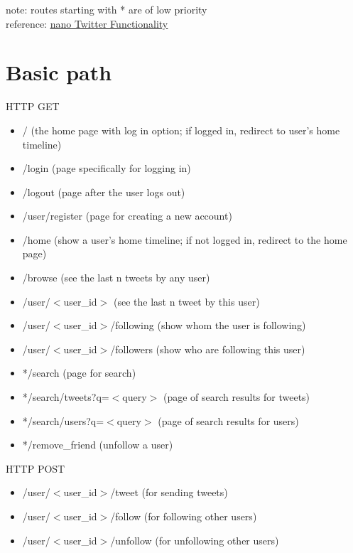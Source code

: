 \documentclass{article}
\begin{document}
	\noindent note: routes starting with * are of low priority \\
	reference: \href{http://cosi105b-f2016.s3-website-us-west-2.amazonaws.com/content/nt/01_nt_functionality.md/}{\underline{nano Twitter Functionality}}
	\section{Basic path}
	HTTP GET
	\begin{itemize}
		\item / (the home page with log in option; if logged in, redirect to user's home timeline)
		\item /login (page specifically for logging in)
		\item /logout (page after the user logs out)
		\item /user/register (page for creating a new account)
		\item /home (show a user's home timeline; if not logged in, redirect to the home page)
		\item /browse (see the last n tweets by any user)
		\item /user/$<$user\_id$>$ (see the last n tweet by this user)
		\item /user/$<$user\_id$>$/following (show whom the user is following)
		\item /user/$<$user\_id$>$/followers (show who are following this user)
		\item */search (page for search)
		\item */search/tweets?q=$<$query$>$ (page of search results for tweets)
		\item */search/users?q=$<$query$>$ (page of search results for users)
		\item */remove\_friend (unfollow a user)
	\end{itemize}
	HTTP POST
	\begin{itemize}
		\item /user/$<$user\_id$>$/tweet (for sending tweets)
		\item /user/$<$user\_id$>$/follow (for following other users)
		\item /user/$<$user\_id$>$/unfollow (for unfollowing other users)
	\end{itemize}
	
\end{document}
